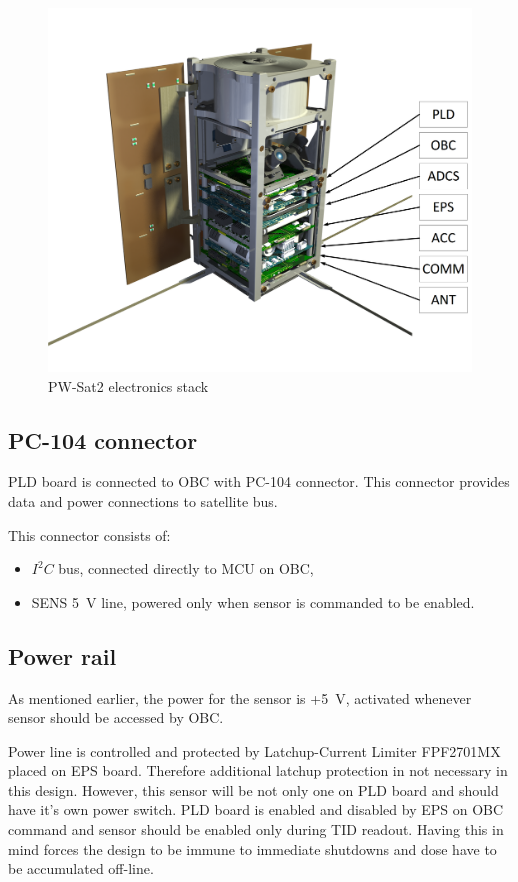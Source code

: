         \begin{figure}[H]
            \centering
            \includegraphics[width=0.7\paperwidth]{img/PW-Sat2-stack.png}
            \caption{PW-Sat2 electronics stack}
            \label{PW-Sat2_stack}
        \end{figure}

    \subsection{PC-104 connector}
        PLD board is connected to OBC with PC-104 connector. This connector provides data and power connections to satellite bus.

        This connector consists of:
        \begin{itemize}
            \item $I^2C$ bus, connected directly to MCU on OBC,
            \item SENS \SI{5}{\volt} line, powered only when sensor is commanded to be enabled.
        \end{itemize}

    \subsection{Power rail}
        As mentioned earlier, the power for the sensor is +\SI{5}{\volt}, activated whenever sensor should be accessed by OBC.

        Power line is controlled and protected by Latchup-Current Limiter FPF2701MX placed on EPS board. Therefore additional latchup protection in not necessary in this design. However, this sensor will be not only one on PLD board and should have it's own power switch. PLD board is enabled and disabled by EPS on OBC command and sensor should be enabled only during TID readout. Having this in mind forces the design to be immune to immediate shutdowns and dose have to be accumulated off-line.

